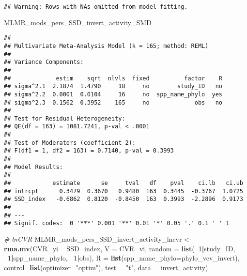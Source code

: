 \documentclass[]{article}
\newenvironment{Shaded}{\begin{snugshade}}{\end{snugshade}}
\newcommand{\KeywordTok}[1]{\textcolor[rgb]{0.13,0.29,0.53}{\textbf{#1}}}
\newcommand{\DataTypeTok}[1]{\textcolor[rgb]{0.13,0.29,0.53}{#1}}
\newcommand{\DecValTok}[1]{\textcolor[rgb]{0.00,0.00,0.81}{#1}}
\newcommand{\StringTok}[1]{\textcolor[rgb]{0.31,0.60,0.02}{#1}}
\newcommand{\CommentTok}[1]{\textcolor[rgb]{0.56,0.35,0.01}{\textit{#1}}}
\newcommand{\OperatorTok}[1]{\textcolor[rgb]{0.81,0.36,0.00}{\textbf{#1}}}
\newcommand{\NormalTok}[1]{#1}
\begin{document}
\begin{verbatim}
## Warning: Rows with NAs omitted from model fitting.
\end{verbatim}

\begin{Shaded}
\begin{Highlighting}[]
\NormalTok{    MLMR_mods_pers_SSD_invert_activity_SMD}
\end{Highlighting}
\end{Shaded}

\begin{verbatim}
## 
## Multivariate Meta-Analysis Model (k = 165; method: REML)
## 
## Variance Components:
## 
##             estim    sqrt  nlvls  fixed          factor    R 
## sigma^2.1  2.1874  1.4790     18     no        study_ID   no 
## sigma^2.2  0.0001  0.0104     16     no  spp_name_phylo  yes 
## sigma^2.3  0.1562  0.3952    165     no             obs   no 
## 
## Test for Residual Heterogeneity:
## QE(df = 163) = 1081.7241, p-val < .0001
## 
## Test of Moderators (coefficient 2):
## F(df1 = 1, df2 = 163) = 0.7140, p-val = 0.3993
## 
## Model Results:
## 
##            estimate      se     tval   df    pval    ci.lb   ci.ub 
## intrcpt      0.3479  0.3670   0.9480  163  0.3445  -0.3767  1.0725    
## SSD_index   -0.6862  0.8120  -0.8450  163  0.3993  -2.2896  0.9173    
## 
## ---
## Signif. codes:  0 '***' 0.001 '**' 0.01 '*' 0.05 '.' 0.1 ' ' 1
\end{verbatim}

\begin{Shaded}
\begin{Highlighting}[]
    \CommentTok{# lnCVR}
\NormalTok{      MLMR_mods_pers_SSD_invert_activity_lncvr <-}\StringTok{ }\KeywordTok{rma.mv}\NormalTok{(CVR_yi }\OperatorTok{~}\StringTok{ }\NormalTok{SSD_index, }\DataTypeTok{V =}\NormalTok{ CVR_vi, }
                                            \DataTypeTok{random =} \KeywordTok{list}\NormalTok{(}\OperatorTok{~}\DecValTok{1}\OperatorTok{|}\NormalTok{study_ID, }\OperatorTok{~}\DecValTok{1}\OperatorTok{|}\NormalTok{spp_name_phylo, }\OperatorTok{~}\DecValTok{1}\OperatorTok{|}\NormalTok{obs), }
                                            \DataTypeTok{R =} \KeywordTok{list}\NormalTok{(}\DataTypeTok{spp_name_phylo=}\NormalTok{phylo_vcv_invert), }\DataTypeTok{control=}\KeywordTok{list}\NormalTok{(}\DataTypeTok{optimizer=}\StringTok{"optim"}\NormalTok{), }
                                            \DataTypeTok{test =} \StringTok{"t"}\NormalTok{, }\DataTypeTok{data =}\NormalTok{ invert_activity) }
\end{Highlighting}
\end{Shaded}
\end{document}
